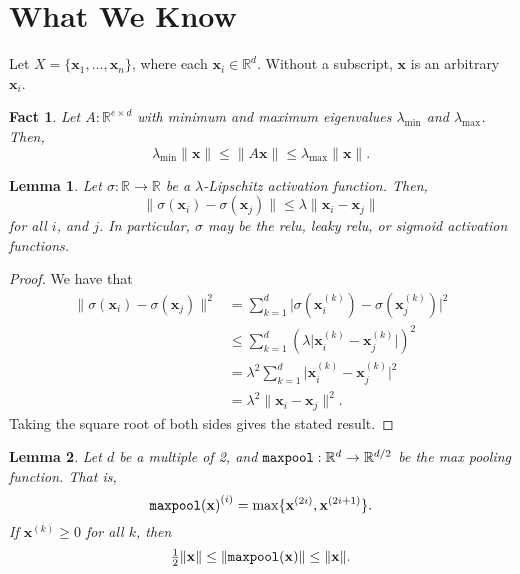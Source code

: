 \documentclass{article}
\newtheorem{lemma}{Lemma}
\newtheorem{fact}{Fact}
\newcommand{\R}{\mathbb{R}}
\newcommand{\abs}[1]{\lvert{#1}\rvert}
\newcommand{\ltwo}[1]{\lVert {#1} \rVert}
\newcommand{\x}{\mathbf x}
\newcommand{\emin}{\lambda_{\text{min}}}
\newcommand{\emax}{\lambda_{\text{max}}}
\DeclareMathOperator{\maxpool}{\textup{\texttt{maxpool}}}
\newcommand{\elem}[2]{{#2}^{(#1)}}
\begin{document}


\section{What We Know}

Let $X=\{\x_1,...,\x_n\}$, where each $\x_i\in\R^d$.
Without a subscript, $\x$ is an arbitrary $\x_i$.

\begin{fact}
    Let $A : \R^{e\times d}$ with minimum and maximum eigenvalues $\emin$ and $\emax$.
    Then,
    \begin{equation}
        \emin\ltwo{\x} \le \ltwo{A\x} \le \emax\ltwo{\x}.
    \end{equation}
\end{fact}

\begin{lemma}
    Let $\sigma:\R\to\R$ be a $\lambda$-Lipschitz activation function.
    Then,
    \begin{equation}
        \ltwo{\sigma(\x_i)-\sigma(\x_j)}
        \le
        \lambda\ltwo{\x_i-\x_j} 
    \end{equation}
    for all $i$, and $j$.
    In particular, $\sigma$ may be the relu, leaky relu, or sigmoid activation functions.
\end{lemma}

\begin{proof}
    We have that
    \begin{align}
        \ltwo{\sigma(\x_i) - \sigma(\x_j)}^2 
        &=
        \sum_{k=1}^d \abs{\sigma(\elem k\x_i) - \sigma(\elem k\x_j)}^2
        \\&\le
        \sum_{k=1}^d (\lambda\abs{\elem k\x_i - \elem k\x_j})^2
        \\&=
        \lambda^2\sum_{k=1}^d \abs{\elem k\x_i - \elem k\x_j}^2
        \\&= 
        \lambda^2\ltwo{\x_i - \x_j}^2 
        .
    \end{align}
    Taking the square root of both sides gives the stated result.
\end{proof}

\begin{lemma}
    Let $d$ be a multiple of 2, and $\maxpool : \R^d \to \R^{d/2}$ be the max pooling function.
    That is,
    \begin{equation}
        \elem{i}{\maxpool(\x)} = \max\{\elem{2i}\x,\elem{2i+1}\x\}
        .
    \end{equation}
    If $\elem k\x\ge0$ for all $k$, then
    \begin{equation}
        \tfrac12\ltwo{\x} \le \ltwo{\maxpool(\x)} \le \ltwo{\x}.
    \end{equation}
\end{lemma}
\end{document}
